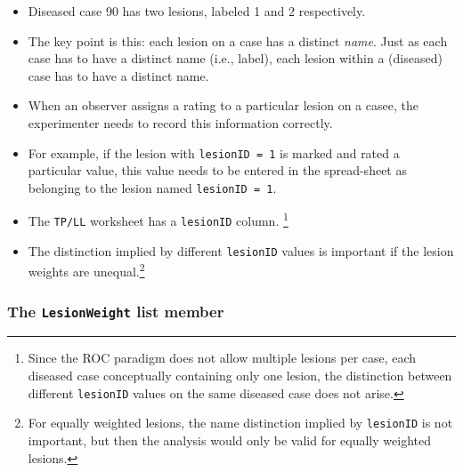 \documentclass[]{book}
\newenvironment{Shaded}{\begin{snugshade}}{\end{snugshade}}
\newcommand{\CommentTok}[1]{\textcolor[rgb]{0.56,0.35,0.01}{\textit{#1}}}
\newcommand{\DecValTok}[1]{\textcolor[rgb]{0.00,0.00,0.81}{#1}}
\newcommand{\NormalTok}[1]{#1}
\newcommand{\OperatorTok}[1]{\textcolor[rgb]{0.81,0.36,0.00}{\textbf{#1}}}
\providecommand{\tightlist}{%
  \setlength{\itemsep}{0pt}\setlength{\parskip}{0pt}}
\let\rmarkdownfootnote\footnote%
\def\footnote{\protect\rmarkdownfootnote}
\begin{document}
\begin{Shaded}
\end{Shaded}

\begin{itemize}
\tightlist
\item
  Diseased case 90 has two lesions, labeled 1 and 2 respectively.
\item
  The key point is this: each lesion on a case has a distinct \emph{name}. Just as each case has to have a distinct name (i.e., label), each lesion within a (diseased) case has to have a distinct name.
\item
  When an observer assigns a rating to a particular lesion on a casee, the experimenter needs to record this information correctly.
\item
  For example, if the lesion with \texttt{lesionID\ =\ 1} is marked and rated a particular value, this value needs to be entered in the spread-sheet as belonging to the lesion named \texttt{lesionID\ =\ 1}.
\item
  The \texttt{TP/LL} worksheet has a \texttt{lesionID} column. \footnote{Since the ROC paradigm does not allow multiple lesions per case, each diseased case conceptually containing only one lesion, the distinction between different \texttt{lesionID} values on the same diseased case does not arise.}
\item
  The distinction implied by different \texttt{lesionID} values is important if the lesion weights are unequal.\footnote{For equally weighted lesions, the name distinction implied by \texttt{lesionID} is not important, but then the analysis would only be valid for equally weighted lesions.}
\end{itemize}

\hypertarget{the-lesionweight-list-member}{%
\subsubsection{\texorpdfstring{The \texttt{LesionWeight} list member}{The LesionWeight list member}}\label{the-lesionweight-list-member}}
\end{document}
